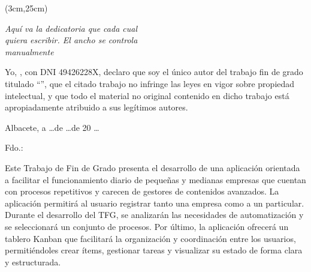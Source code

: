 \begin{textblock*}{\linewidth}(3cm,25cm) 
\begin{flushright}
{\fontsize{14pt}{4pt}\selectfont \fecha}
\end{flushright}
\end{textblock*}


\cleardoublepage
\thispagestyle{empty}

\vspace*{9cm}  
\begin{flushright} \em 
Aquí va la dedicatoria que cada cual \\ 
quiera escribir. El ancho se controla \\ 
manualmente
\end{flushright}


\cleardoublepage
\thispagestyle{plain}
\begin{center}
\Large{}
\end{center}
\vskip1cm

Yo, \autor, con DNI 49426228X, declaro que soy el único autor del trabajo fin de grado titulado ``\titulo'', que el citado trabajo no infringe las leyes en vigor sobre propiedad intelectual, y que todo el material no original contenido en dicho trabajo está apropiadamente atribuido a sus legítimos autores.

\vspace*{2cm}
\begin{center}
Albacete, a \quad \ldots \quad de \quad \ldots \quad de 20 \ldots

\vskip3cm

Fdo.: \autor
\end{center}


\cleardoublepage
\thispagestyle{plain}
\begin{center}
\Large{}
\end{center}
\vskip1cm
Este Trabajo de Fin de Grado presenta el desarrollo de una aplicación orientada a facilitar el funcionamiento diario de pequeñas y medianas empresas que cuentan con procesos repetitivos y carecen de gestores de contenidos avanzados. La aplicación permitirá al usuario registrar tanto una empresa como a un particular. Durante el desarrollo del TFG, se analizarán las necesidades de automatización y se seleccionará un conjunto de procesos. Por último, la aplicación ofrecerá un tablero Kanban que facilitará la organización y coordinación entre los usuarios, permitiéndoles crear ítems, gestionar tareas y visualizar su estado de forma clara y estructurada.

\cleardoublepage
\thispagestyle{plain}
\begin{center}
\Large{}
\end{center}
\vskip1cm

\lipsum[1]